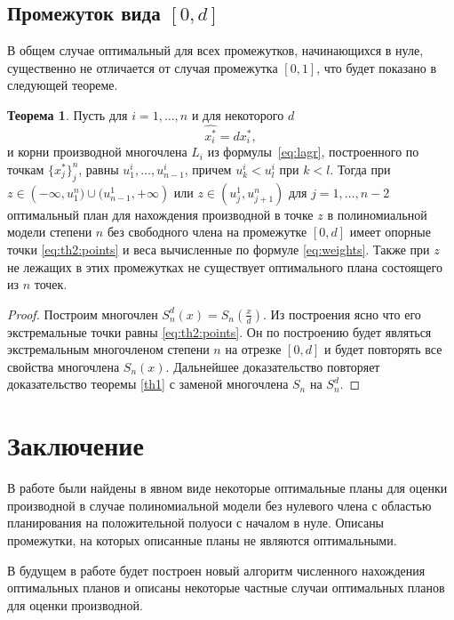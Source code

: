 \documentclass[specialist,
               substylefile = spbu.rtx,
               subf,href,colorlinks=true, 12pt]{disser}
\theoremstyle{definition}
\newtheorem{theorem}{Теорема}
\begin{document}
	\section{Промежуток вида $[0, d]$}
	
	В общем случае оптимальный для всех промежутков, начинающихся в нуле, существенно не отличается от случая промежутка $[0, 1]$, что будет показано в следующей теореме.
	
	\begin{theorem}
		Пусть для $i = 1, \ldots, n$ и для некоторого $d$
		\begin{equation}
			\label{eq:th2:points}
			\widehat{x_i^*} = d x_i^* ,
		\end{equation}
		и корни производной многочлена $L_i$ из формулы~\eqref{eq:lagr}, построенного по точкам $\{x_j^*\}_j^n$, равны $u_1^i, \ldots, u_{n-1}^i$, причем $u_k^i < u_l^i$ при $k < l$. Тогда при $z \in \left(-\infty, u_1^n) \cup (u_{n-1}^1, +\infty \right)$ или $z \in \left( u^1_j, u^n_{j+1} \right)$ для $j=1, \ldots, n-2$ оптимальный план для нахождения производной в точке $z$ в полиномиальной модели степени $n$ без свободного члена на промежутке $[0, d]$ имеет опорные точки \eqref{eq:th2:points} и веса вычисленные по формуле \eqref{eq:weights}. Также при $z$ не лежащих в этих промежутках не существует оптимального плана состоящего из $n$ точек.
	\end{theorem}
	
	\begin{proof}
		Построим многочлен $S_n^d(x) = S_n(\frac{x}{d})$. Из построения ясно что его экстремальные точки равны \eqref{eq:th2:points}. Он по построению будет являться экстремальным многочленом степени $n$ на отрезке $[0, d]$ и будет повторять все свойства многочлена $S_n(x)$. Дальнейшее доказательство повторяет доказательство теоремы \ref{th1} с заменой многочлена $S_n$ на $S_n^d$.
	\end{proof}	
	
	
\chapter*{Заключение}
	В работе были найдены в явном виде некоторые оптимальные планы для оценки производной в случае полиномиальной модели без нулевого члена с областью планирования на положительной полуоси с началом в нуле. Описаны промежутки, на которых описанные планы не являются оптимальными.
	
	В будущем в работе будет построен новый алгоритм численного нахождения оптимальных планов и описаны некоторые частные случаи оптимальных планов для оценки производной.
	
	\nocite{*}
	
	
	
\end{document}
